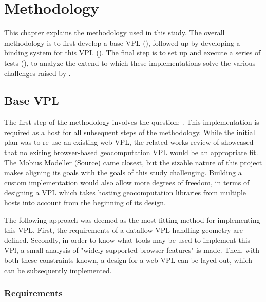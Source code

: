 \chapter{Methodology}
\label{chap:methodology}

This chapter explains the methodology used in this study. 
The overall methodology is to first develop a base VPL (), followed up by developing a binding system for this VPL (). 
The final step is to set up and execute a series of tests (), to analyze the extend to which these implementations solve the various challenges raised by .

\section{Base VPL} 
\label{sec:method-base-vpl}

The first step of the methodology involves the question: \mySubRQOne.
This implementation is required as a host for all subsequent steps of the methodology. 
While the initial plan was to re-use an existing web VPL, the related works review of  showcased that no exiting browser-based geocomputation VPL would be an appropriate fit.
The Mobius Modeller (Source) came closest, but the sizable nature of this project makes aligning its goals with the goals of this study challenging. 
Building a custom implementation would also allow more degrees of freedom, in terms of designing a VPL which takes hosting geocomputation libraries from multiple hosts  into account from the beginning of its design. 

The following approach was deemed as the most fitting method for implementing this VPL. 
First, the requirements of a dataflow-VPL handling geometry are defined.
Secondly, in order to know what tools may be used to implement this VPl, a small analysis of "widely supported browser features" is made. 
Then, with both these constraints known, a design for a web VPL can be layed out, which can be subsequently implemented. 

\subsection*{Requirements}

